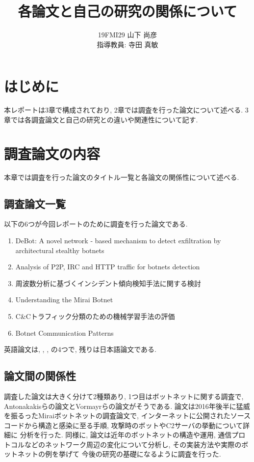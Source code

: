 \documentclass[twocolumn,9]{ltjsarticle}
\title{各論文と自己の研究の関係について}
\author{19FMI29 山下 尚彦 \\ 指導教員: 寺田 真敏}
\date{}
\begin{document}
\maketitle

\section{はじめに}
本レポートは3章で構成されており, 2章では調査を行った論文について述べる. 
3章では各調査論文と自己の研究との違いや関連性について記す. 

\section{調査論文の内容}
本章では調査を行った論文のタイトル一覧と各論文の関係性について述べる. 

\subsection{調査論文一覧}
以下の6つが今回レポートのために調査を行った論文である. 

\begin{enumerate}
  \item
    DeBot: A novel network ‐ based mechanism to detect exfiltration by architectural stealthy botnets
    \cite{venkatesan2018debot}
  \item
    Analysis of P2P, IRC and HTTP traffic for botnets detection
    \cite{assadhan2018analysis}
  \item
    周波数分析に基づくインシデント傾向検知手法に関する検討
    \cite{仲小路博史2005周波数分析に基づくインシデント傾向検知手法に関する検討}
  \item
    Understanding the Mirai Botnet
    \cite{antonakakis2017understanding}
  \item
    C\&Cトラフィック分類のための機械学習手法の評価
    \cite{山内一将2015c}
  \item
    Botnet Communication Patterns
    \cite{vormayr2017botnet}
\end{enumerate}

英語論文は\cite{venkatesan2018debot}, \cite{assadhan2018analysis}, \cite{antonakakis2017understanding},
\cite{vormayr2017botnet}の4つで, 残りは日本語論文である. 

\subsection{論文間の関係性}
調査した論文は大きく分けて2種類あり, 1つ目はボットネットに関する調査で, 
Antonakakisらの論文\cite{antonakakis2017understanding}とVormayrらの論文\cite{vormayr2017botnet}がそうである. 
論文\cite{antonakakis2017understanding}は2016年後半に猛威を振るったMiraiボットネットの調査論文で, 
インターネットに公開されたソースコードから構造と感染に至る手順, 攻撃時のボットやC2サーバの挙動について詳細に
分析を行った. 同様に, 論文\cite{vormayr2017botnet}は近年のボットネットの構造や運用, 
通信プロトコルなどのネットワーク周辺の変化について分析し, その実装方法や実際のボットネットの例を挙げて
今後の研究の基礎になるように調査を行った. 
\end{document}
